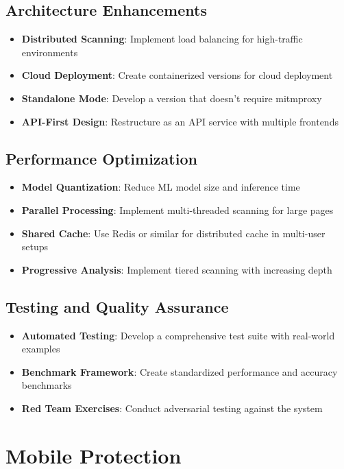 \subsection{Architecture Enhancements}
\begin{itemize}
    \item \textbf{Distributed Scanning}: Implement load balancing for high-traffic environments
    \item \textbf{Cloud Deployment}: Create containerized versions for cloud deployment
    \item \textbf{Standalone Mode}: Develop a version that doesn't require mitmproxy
    \item \textbf{API-First Design}: Restructure as an API service with multiple frontends
\end{itemize}

\subsection{Performance Optimization}
\begin{itemize}
    \item \textbf{Model Quantization}: Reduce ML model size and inference time
    \item \textbf{Parallel Processing}: Implement multi-threaded scanning for large pages
    \item \textbf{Shared Cache}: Use Redis or similar for distributed cache in multi-user setups
    \item \textbf{Progressive Analysis}: Implement tiered scanning with increasing depth
\end{itemize}

\subsection{Testing and Quality Assurance}
\begin{itemize}
    \item \textbf{Automated Testing}: Develop a comprehensive test suite with real-world examples
    \item \textbf{Benchmark Framework}: Create standardized performance and accuracy benchmarks
    \item \textbf{Red Team Exercises}: Conduct adversarial testing against the system
\end{itemize}

\section{Mobile Protection}

